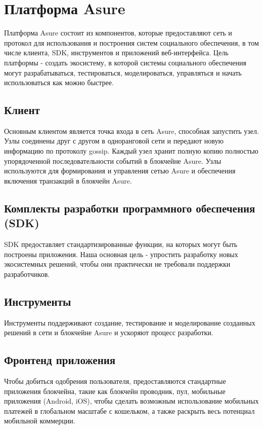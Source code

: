 \section{Платформа Asure}

Платформа Asure состоит из компонентов, которые предоставляют сеть и протокол для использования и построения систем социального обеспечения, в том числе клиента, SDK, инструментов и приложений веб-интерфейса. Цель платформы - создать экосистему, в которой системы социального обеспечения могут разрабатываться, тестироваться, моделироваться, управляться и начать использоваться как можно быстрее.

\subsection{Клиент}
Основным клиентом является точка входа в сеть Asure, способная запустить узел. Узлы соединены друг с другом в одноранговой сети и передают новую информацию по протоколу gossip. Каждый узел хранит полную копию полностью упорядоченной последовательности событий в блокчейне Asure. Узлы используются для формирования и управления сетью Asure и обеспечения включения транзакций в блокчейн Asure.

\subsection{Комплекты разработки программного обеспечения (SDK)}
SDK предоставляет стандартизированные функции, на которых могут быть построены приложения. Наша основная цель - упростить разработку новых экосистемных решений, чтобы они практически не требовали поддержки разработчиков.

\subsection{Инструменты}
Инструменты поддерживают создание, тестирование и моделирование созданных решений в сети и блокчейне Asure и ускоряют процесс разработки.

\subsection{Фронтенд приложения}
Чтобы добиться одобрения пользователя, предоставляются стандартные приложения блокчейна, такие как блокчейн проводник, пул, мобильные приложения (Android, iOS), чтобы сделать возможным использование мобильных платежей в глобальном масштабе с кошельком, а также раскрыть весь потенциал мобильной коммерции.
